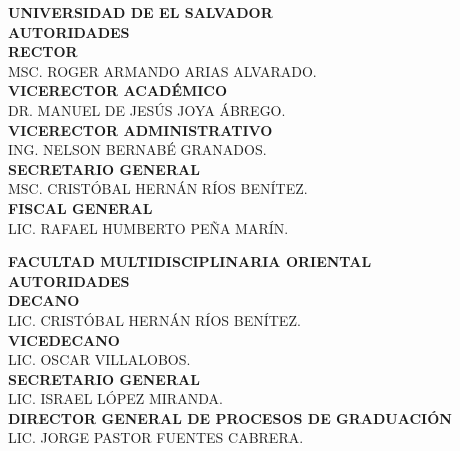 \newpage
\begin{center}
	\thispagestyle{empty}%
	\begin{large}
		\textbf{
			UNIVERSIDAD DE EL SALVADOR\\
			\vspace{0.5in}
			AUTORIDADES\\
			\vspace{0.8in}
			RECTOR\\
		}
		MSC. ROGER ARMANDO ARIAS ALVARADO.\\
		\vspace{0.8in}
		\textbf{VICERECTOR ACADÉMICO}\\
		DR. MANUEL DE JESÚS JOYA ÁBREGO.\\
		\vspace{0.8in}
		\textbf{VICERECTOR ADMINISTRATIVO}\\
		ING. NELSON BERNABÉ GRANADOS.\\
		\vspace{0.8in}
		\textbf{SECRETARIO GENERAL}\\
		MSC. CRISTÓBAL HERNÁN RÍOS BENÍTEZ.\\
		\vspace{0.8in}
		\textbf{FISCAL GENERAL}\\
		LIC. RAFAEL HUMBERTO PEÑA MARÍN.\\
	\end{large}
	\newpage
	\thispagestyle{empty}%
	\begin{large}
		\textbf{
			FACULTAD MULTIDISCIPLINARIA ORIENTAL\\
			\vspace{0.8in}
			AUTORIDADES\\
			\vspace{1.0in}
			DECANO\\
		}
		LIC. CRISTÓBAL HERNÁN RÍOS BENÍTEZ.\\
		\vspace{1.0in}
		\textbf{VICEDECANO}\\
		LIC. OSCAR VILLALOBOS.\\
		\vspace{1.0in}
		\textbf{SECRETARIO GENERAL}\\
		LIC. ISRAEL LÓPEZ MIRANDA.\\
		\vspace{1.0in}
		\textbf{DIRECTOR GENERAL DE PROCESOS DE GRADUACIÓN}\\
		LIC. JORGE PASTOR FUENTES CABRERA.\\
	\end{large}

\end{center}
